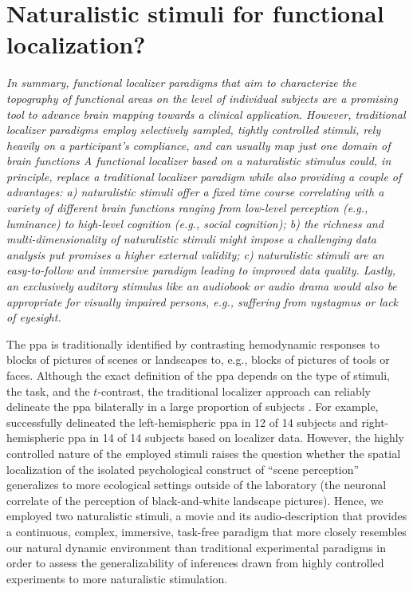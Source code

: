 


\section{Naturalistic stimuli for functional localization?}



\textit{
In summary, functional localizer paradigms that aim to characterize the
topography of functional areas on the level of individual subjects are a
promising tool to advance brain mapping towards a clinical application.
However, traditional localizer paradigms employ selectively sampled, tightly
controlled stimuli, rely heavily on a participant's compliance, and can usually
map just one domain of brain functions
A functional localizer based on a naturalistic stimulus could, in principle,
replace a traditional localizer paradigm while also providing a couple of
advantages:
a) naturalistic stimuli offer a fixed time course correlating with a variety of
different brain functions ranging from low-level perception (e.g., luminance) to
high-level cognition (e.g., social cognition);
b) the richness and multi-dimensionality of naturalistic stimuli might impose a
challenging data analysis put promises a higher external validity;
c) naturalistic stimuli are an easy-to-follow and immersive paradigm leading to
improved data quality.
Lastly, an exclusively auditory stimulus like an audiobook or audio drama would
also be appropriate for visually impaired persons, e.g., suffering from
nystagmus or lack of eyesight.}

%
The \ac{ppa} is traditionally identified by contrasting hemodynamic responses to
blocks of pictures of scenes or landscapes to, e.g., blocks of pictures of tools
or faces.
%
Although the exact definition of the \ac{ppa} depends on the type of stimuli,
the task, and the $t$-contrast, the traditional localizer approach can reliably
delineate the \ac{ppa} bilaterally in a large proportion of subjects
\citep{zhen2017quantifying}.
%
For example, \citet{sengupta2016extension} successfully delineated the
left-hemispheric \ac{ppa} in 12 of 14 subjects and right-hemispheric \ac{ppa} in
14 of 14 subjects based on localizer data.
%
However, the highly controlled nature of the employed stimuli raises the
question whether the spatial localization of the isolated psychological
construct of ``scene perception'' generalizes to more ecological settings
outside of the laboratory (the neuronal correlate of the perception of
black-and-white landscape pictures).
%
Hence, we employed two naturalistic stimuli, a movie and its audio-description
that provides a continuous, complex, immersive, task-free paradigm that more
closely resembles our natural dynamic environment than traditional experimental
paradigms in order to assess the generalizability of inferences drawn from
highly controlled experiments to more naturalistic stimulation.



